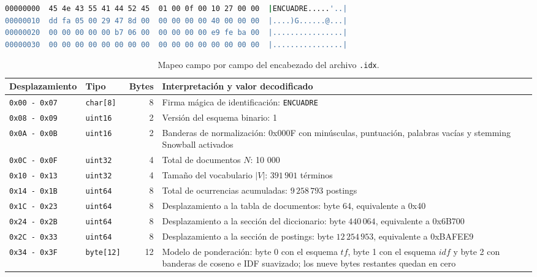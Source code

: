 \documentclass[11pt,spanish]{article}
\begin{document}
\begin{lstlisting}[language=bash, caption={Volcado del encabezado mediante \texttt{hexdump}.}]
00000000  45 4e 43 55 41 44 52 45  01 00 0f 00 10 27 00 00  |ENCUADRE.....'..|
00000010  dd fa 05 00 29 47 8d 00  00 00 00 00 40 00 00 00  |....)G......@...|
00000020  00 00 00 00 00 b7 06 00  00 00 00 00 e9 fe ba 00  |................|
00000030  00 00 00 00 00 00 00 00  00 00 00 00 00 00 00 00  |................|
\end{lstlisting}

\begin{table}[htbp]
  \centering
  \small
  \caption{Mapeo campo por campo del encabezado del archivo \texttt{.idx}.}
  \label{tab:encabezado-binario}
  \begin{tabularx}{\linewidth}{llrY}
    \toprule
    \textbf{Desplazamiento} & \textbf{Tipo} & \textbf{Bytes} & \textbf{Interpretación y valor decodificado} \\
    \midrule
    \texttt{0x00 - 0x07} & \texttt{char[8]} & 8 & Firma mágica de identificación: \texttt{ENCUADRE} \\
    \texttt{0x08 - 0x09} & \texttt{uint16}  & 2 & Versión del esquema binario: 1 \\
    \texttt{0x0A - 0x0B} & \texttt{uint16}  & 2 & Banderas de normalización: 0x000F con minúsculas, puntuación, palabras vacías y stemming Snowball activados \\
    \texttt{0x0C - 0x0F} & \texttt{uint32}  & 4 & Total de documentos $N$: 10 000 \\
    \texttt{0x10 - 0x13} & \texttt{uint32}  & 4 & Tamaño del vocabulario $|V|$: $391\,901$ términos \\
    \texttt{0x14 - 0x1B} & \texttt{uint64}  & 8 & Total de ocurrencias acumuladas: $9\,258\,793$ postings \\
    \texttt{0x1C - 0x23} & \texttt{uint64}  & 8 & Desplazamiento a la tabla de documentos: byte 64, equivalente a 0x40 \\
    \texttt{0x24 - 0x2B} & \texttt{uint64}  & 8 & Desplazamiento a la sección del diccionario: byte $440\,064$, equivalente a 0x6B700 \\
    \texttt{0x2C - 0x33} & \texttt{uint64}  & 8 & Desplazamiento a la sección de postings: byte $12\,254\,953$, equivalente a 0xBAFEE9 \\
    \texttt{0x34 - 0x3F} & \texttt{byte[12]} & 12 & Modelo de ponderación: byte 0 con el esquema $tf$, byte 1 con el esquema $idf$ y byte 2 con banderas de coseno e IDF suavizado; los nueve bytes restantes quedan en cero \\
    \bottomrule
  \end{tabularx}
\end{table}
\end{document}
